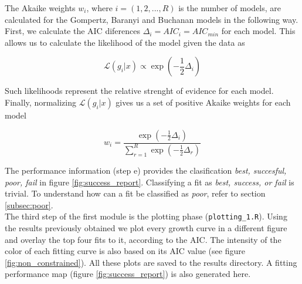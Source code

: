 \documentclass[titlepage,11pt]{article}
\begin{document}
\begin{linenumbers}
		The Akaike weights $ w_i $, where $ i  = (1, 2, ..., R)$ is the number of models, are calculated for the Gompertz, Baranyi and Buchanan models in the following way. \cite{Anderson2002}\\
		First, we calculate the AIC diferences $ \Delta_i = AIC_i = AIC_{min}$ for each model. This allows us to calculate the likelihood of the model given the data as
		\begin{linenomath*}
			\begin{equation}
				\mathcal{L}(g_i|x) \propto \exp\left(-\frac 1 2 \Delta_i\right)
			\end{equation}
		\end{linenomath*}
		Such likelihoods represent the relative strenght of evidence for each model.
		Finally, normalizing $ \mathcal{L}(g_i|x) $ gives us a set of positive Akaike weights for each model
		\begin{linenomath*}
			\begin{equation}
				w_i = \frac{\exp\left(-\frac 1 2 \Delta_i\right)}{\sum\limits_{r = 1}^{R}\exp\left(-\frac 1 2 \Delta_r\right)}
			\end{equation}
		\end{linenomath*}
		The performance information (step e) provides the clasification \textit{best, succesful, poor, fail} in figure \ref{fig:success_report}.  Classifying a fit as \textit{best, success, or fail} is trivial. To understand how can a fit be classified as \textit{poor}, refer to section \ref{subsec:poor}.\\
			
		The third step of the first module is the plotting phase (\verb|plotting_1.R|). Using the results previously obtained we plot every growth curve in a different figure and overlay the top four fits to it, according to the AIC. The intensity of the color of each fitting curve is also based on its AIC value (see figure \ref{fig:non_constrained}). All these plots are saved to the results directory. A fitting performance map (figure \ref{fig:success_report}) is also generated here.

\end{linenumbers}
\end{document}
